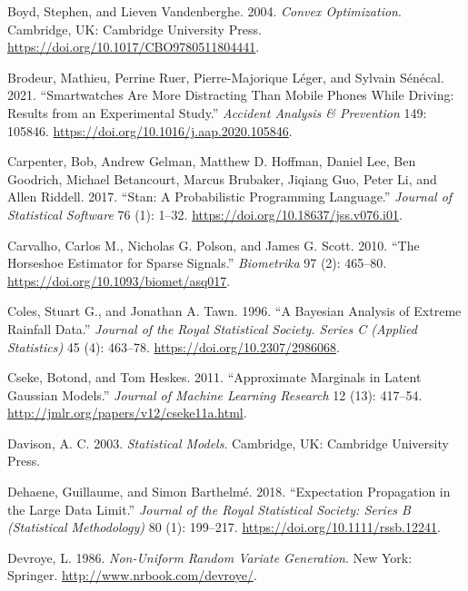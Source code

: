 \documentclass[
  11pt,
  letterpaper,
]{scrbook}
\newlength{\cslhangindent}
\newenvironment{CSLReferences}[2] %
 {\begin{list}{}{%
  \setlength{\itemindent}{0pt}
  \setlength{\leftmargin}{0pt}
  \setlength{\parsep}{0pt}
  \ifodd #1
   \setlength{\leftmargin}{\cslhangindent}
   \setlength{\itemindent}{-1\cslhangindent}
  \fi
  \setlength{\itemsep}{#2\baselineskip}}}
 {\end{list}}
\theoremstyle{plain}
\theoremstyle{definition}
\theoremstyle{definition}
\theoremstyle{plain}
\theoremstyle{plain}
\theoremstyle{definition}
\theoremstyle{remark}
\begin{document}
\begin{CSLReferences}{1}{0}
Boyd, Stephen, and Lieven Vandenberghe. 2004. \emph{Convex
Optimization}. Cambridge, UK: Cambridge University Press.
\url{https://doi.org/10.1017/CBO9780511804441}.

Brodeur, Mathieu, Perrine Ruer, Pierre-Majorique Léger, and Sylvain
Sénécal. 2021. {``Smartwatches Are More Distracting Than Mobile Phones
While Driving: Results from an Experimental Study.''} \emph{Accident
Analysis \& Prevention} 149: 105846.
\url{https://doi.org/10.1016/j.aap.2020.105846}.

Carpenter, Bob, Andrew Gelman, Matthew D. Hoffman, Daniel Lee, Ben
Goodrich, Michael Betancourt, Marcus Brubaker, Jiqiang Guo, Peter Li,
and Allen Riddell. 2017. {``{Stan}: A Probabilistic Programming
Language.''} \emph{Journal of Statistical Software} 76 (1): 1--32.
\url{https://doi.org/10.18637/jss.v076.i01}.

Carvalho, Carlos M., Nicholas G. Polson, and James G. Scott. 2010.
{``The Horseshoe Estimator for Sparse Signals.''} \emph{Biometrika} 97
(2): 465--80. \url{https://doi.org/10.1093/biomet/asq017}.

Coles, Stuart G., and Jonathan A. Tawn. 1996. {``A {B}ayesian Analysis
of Extreme Rainfall Data.''} \emph{Journal of the Royal Statistical
Society. Series C (Applied Statistics)} 45 (4): 463--78.
\url{https://doi.org/10.2307/2986068}.

Cseke, Botond, and Tom Heskes. 2011. {``Approximate Marginals in Latent
{G}aussian Models.''} \emph{Journal of Machine Learning Research} 12
(13): 417--54. \url{http://jmlr.org/papers/v12/cseke11a.html}.

Davison, A. C. 2003. \emph{Statistical Models}. Cambridge, UK: Cambridge
University Press.

Dehaene, Guillaume, and Simon Barthelmé. 2018. {``Expectation
Propagation in the Large Data Limit.''} \emph{Journal of the Royal
Statistical Society: Series B (Statistical Methodology)} 80 (1):
199--217. \url{https://doi.org/10.1111/rssb.12241}.

Devroye, L. 1986. \emph{Non-Uniform Random Variate Generation}. New
York: Springer. \url{http://www.nrbook.com/devroye/}.


\end{CSLReferences}
\end{document}
